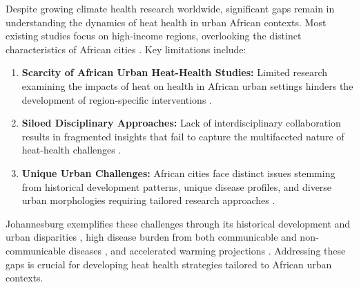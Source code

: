 Despite growing climate health research worldwide, significant gaps remain in understanding the dynamics of heat health in urban African contexts. Most existing studies focus on high-income regions, overlooking the distinct characteristics of African cities \citep{Khine2023, Pasquini2020}. Key limitations include:

\begin{enumerate}
    \item \textbf{Scarcity of African Urban Heat-Health Studies:} Limited research examining the impacts of heat on health in African urban settings hinders the development of region-specific interventions \citep{Ncongwane2021, Wright2019}.

    \item \textbf{Siloed Disciplinary Approaches:} Lack of interdisciplinary collaboration results in fragmented insights that fail to capture the multifaceted nature of heat-health challenges \citep{Jack}.

    \item \textbf{Unique Urban Challenges:} African cities face distinct issues stemming from historical development patterns, unique disease profiles, and diverse urban morphologies requiring tailored research approaches \citep{Giombini2022, Venter2020}.
\end{enumerate}

Johannesburg exemplifies these challenges through its historical development and urban disparities \citep{Strauss2019}, high disease burden from both communicable and non-communicable diseases \citep{Wright2021}, and accelerated warming projections \citep{Engelbrecht2015, Souverijns2022}. Addressing these gaps is crucial for developing heat health strategies tailored to African urban contexts.